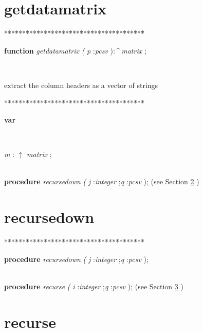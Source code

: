 \section{getdatamatrix}\label{sec:csvfilereadergetdatamatrix}

\begin{tabbing}
***\=***\=***\=***\=***\=***\=***\=***\=***\=***\=***\=***\=***\=\kill
\parbox{14cm}{\textsf{\textbf{function}  \textit{getdatamatrix} \textit{(} \textit{p} :\textit{pcsv} ):\textit{\^{}} \textit{matrix} ;}}\\
\end{tabbing}
extract the column headers as a vector of strings
\begin{tabbing}
***\=***\=***\=***\=***\=***\=***\=***\=***\=***\=***\=***\=***\=\kill
\\
\+\parbox{14cm}{\textsf{\textbf{var} }}\\
\parbox{14cm}{\textsf{\textit{m} : $\uparrow$ \textit{matrix} }; }\\
\<\textsf{\textbf{procedure}  \textit{recursedown} \textit{(} \textit{j} :\textit{integer} ;\textit{q} :\textit{pcsv} );} (see Section \ref{sec:csvfilereader/getdatamatrixrecursedown} )\\
\end{tabbing}
\section{recursedown}\label{sec:csvfilereader/getdatamatrixrecursedown}

\begin{tabbing}
***\=***\=***\=***\=***\=***\=***\=***\=***\=***\=***\=***\=***\=\kill
\parbox{14cm}{\textsf{\textbf{procedure}  \textit{recursedown} \textit{(} \textit{j} :\textit{integer} ;\textit{q} :\textit{pcsv} );}}\\
\+\textsf{\textbf{procedure}  \textit{recurse} \textit{(} \textit{i} :\textit{integer} ;\textit{q} :\textit{pcsv} );} (see Section \ref{sec:csvfilereader/getdatamatrix/recursedownrecurse} )\\
\end{tabbing}
\section{recurse}\label{sec:csvfilereader/getdatamatrix/recursedownrecurse}

